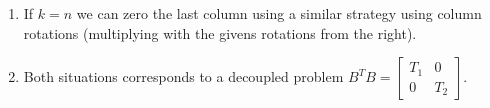 \documentclass[a4paper,8pt]{beamer} %
\newcommand{\smatrix}[1]{\left[\begin{matrix} #1 \end{matrix}\right]}
\begin{document}
\begin{frame}
\begin{itemize}
\begin{enumerate}
\begin{footnotesize}
\begin{align}
{							0 & -s & 0 & c & 0   \\
							0 & 0 & 0 & 0 & 1  \\
						}
						\smatrix
						{
							\times 	& \times & 0 & 0 & 0   \\
							0 	& 0 & 0 & + & 0   \\
							0 	& 0 & \times & \times & 0    \\
							0 & 0 & 0 & \times & \times   \\
							0 & 0 & 0 & 0 & \times  \\
						}
						=
						\smatrix
						{
							\times 	& \times & 0 & 0 & 0   \\
							0 	& 0 & 0 & 0 & +   \\
							0 	& 0 & \times & \times & 0    \\
							0 & 0 & 0 & \times & \times   \\
							0 & 0 & 0 & 0 & \times  \\
						}\\
						&\smatrix
						{
							1 & 0 & 0 & 0 & 0   \\
							0 & c & 0 & 0 & s   \\
							0 & 0 & 1 & 0 & 0    \\
							0 & 0 & 0 & 1 & 0   \\
							0 & -s & 0 & 0 & c  \\
						}
						\smatrix
						{
							\times 	& \times & 0 & 0 & 0   \\
							0 	& 0 & 0 & 0 & +   \\
							0 	& 0 & \times & \times & 0    \\
							0 & 0 & 0 & \times & \times   \\
							0 & 0 & 0 & 0 & \times  \\
						}
						=
						\smatrix
						{
							\times 	& \times & 0 & 0 & 0   \\
							0 	& 0 & 0 & 0 & 0   \\
							0 	& 0 & \times & \times & 0    \\
							0 & 0 & 0 & \times & \times   \\
							0 & 0 & 0 & 0 & \times  \\
						}
				\end{align}
				This situation corresponds to a degeneracy in the eigenvalues since $B^TB$ in this case have
				a $2\times 2$ block with equal elements in the upper left block of $B^TB$.
				\end{footnotesize}
			\item If $k=n$ we can zero the last column using a similar strategy using column rotations (multiplying with the givens rotations from the right).
				\item Both situations corresponds to a decoupled problem $B^TB=\smatrix{T_1&0 \\ 0&T_2}$.
		\end{enumerate}
\end{itemize}
\end{frame}%
\end{document}
